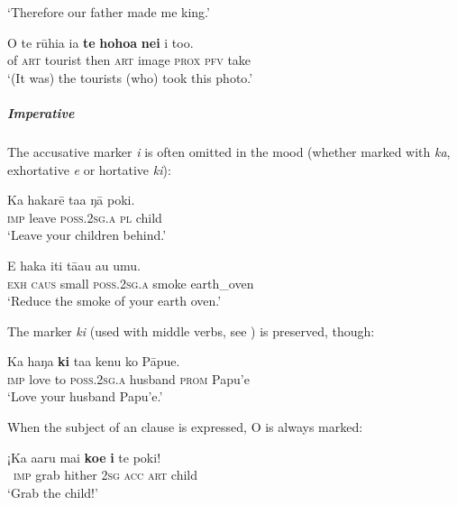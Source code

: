 \glt 
‘Therefore our father made me king.’ \textstyleExampleref{[Ley-2-06.036]}
\z

\ea\label{ex:8.29}
\gll O te rūhia ia \textbf{te} \textbf{hoho{\ꞌ}a} \textbf{nei} i to{\ꞌ}o. \\
of \textsc{art} tourist then \textsc{art} image \textsc{prox} \textsc{pfv} take \\

\glt 
‘(It was) the tourists (who) took this photo.’ \textstyleExampleref{[R415.735]} 
\z

\subparagraph{Imperative} The accusative marker \textit{i} is often omitted in the  mood (wheth\-er marked with \textit{ka}, exhortative \textit{e} or hortative \textit{ki}):

\ea\label{ex:8.30}
\gll Ka hakarē ta{\ꞌ}a ŋā poki. \\
\textsc{imp} leave \textsc{poss.2sg.a} \textsc{pl} child \\

\glt 
‘Leave your children behind.’ \textstyleExampleref{[R245.224]} 
\z

\ea\label{ex:8.31}
\gll E haka {\ꞌ}iti tā{\ꞌ}au {\ꞌ}au {\ꞌ}umu.\\
\textsc{exh} \textsc{caus} small \textsc{poss.2sg.a} smoke earth\_oven\\

\glt
‘Reduce the smoke of your earth oven.’ \textstyleExampleref{[Mtx-7-12.026]}
\z

The marker \textit{ki} (used with middle verbs, see ) is preserved, though:

\ea\label{ex:8.32}
\gll Ka haŋa \textbf{ki} ta{\ꞌ}a kenu ko Pāpu{\ꞌ}e.\\
\textsc{imp} love to \textsc{poss.2sg.a} husband \textsc{prom} Papu’e\\

\glt
‘Love your husband Papu’e.’ \textstyleExampleref{[R372.034]} 
\z

When the subject of an  clause is expressed, O is always marked:

\ea\label{ex:8.33}
\gll ¡Ka {\ꞌ}a{\ꞌ}aru mai \textbf{koe} \textbf{i} te poki!\\
~\textsc{imp} grab hither \textsc{2sg} \textsc{acc} \textsc{art} child\\

\glt
‘Grab the child!’ \textstyleExampleref{[R210.063]} 
\z

